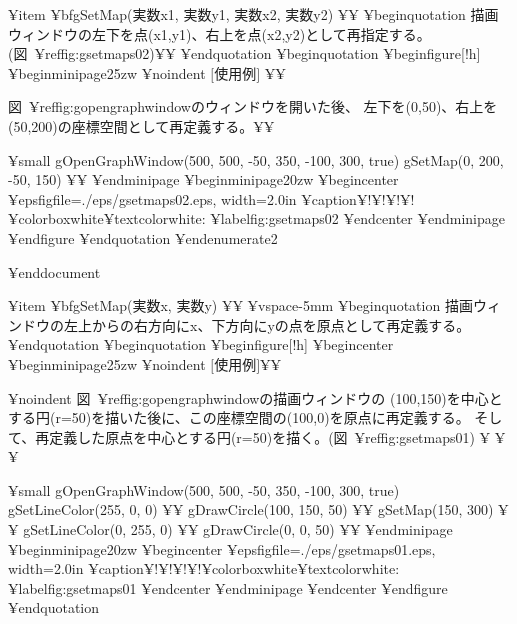 ¥item {¥bf{gSetMap(実数x1, 実数y1, 実数x2, 実数y2)}} ¥¥
  ¥begin{quotation}
     描画ウィンドウの左下を点(x1,y1)、右上を点(x2,y2)として再指定する。
     (図~¥ref{fig:gsetmaps02})¥¥
  ¥end{quotation}
¥begin{quotation}
¥begin{figure}[!h]
¥begin{minipage}{25zw}
¥noindent $[$使用例$]$ ¥¥

図~¥ref{fig:gopengraphwindow}のウィンドウを開いた後、
左下を(0,50)、右上を(50,200)の座標空間として再定義する。¥¥


{¥small{
 gOpenGraphWindow(500, 500, -50, 350, -100, 300, true)
 gSetMap(0, 200, -50, 150) ¥¥
}}
¥end{minipage}
¥begin{minipage}{20zw}
¥begin{center}
¥epsfig{file=./eps/gsetmaps02.eps, width=2.0in}
¥caption{$¥!¥!¥!¥!$¥colorbox{white}{{¥textcolor{white}{:}}}}
¥label{fig:gsetmaps02}
¥end{center}
¥end{minipage}
¥end{figure}
   ¥end{quotation}
¥end{enumerate2}

¥end{document}

¥item {¥bf{gSetMap(実数x, 実数y)}} ¥¥
¥vspace{-5mm}
   ¥begin{quotation}
     描画ウィンドウの左上からの右方向にx、下方向にyの点を原点として再定義する。
   ¥end{quotation}
   ¥begin{quotation}
¥begin{figure}[!h]
¥begin{center}
¥begin{minipage}{25zw}
	   ¥noindent $[$使用例$]$¥¥

¥noindent 図~¥ref{fig:gopengraphwindow}の描画ウィンドウの
(100,150)を中心とする円(r=50)を描いた後に、この座標空間の(100,0)を原点に再定義する。
そして、再定義した原点を中心とする円(r=50)を描く。(図~¥ref{fig:gsetmaps01})
¥ ¥¥

{¥small{
          gOpenGraphWindow(500, 500, -50, 350, -100, 300, true)
          gSetLineColor(255, 0, 0)  ¥¥
          gDrawCircle(100, 150, 50)  ¥¥
          gSetMap(150, 300) ¥¥
          gSetLineColor(0, 255, 0)  ¥¥
          gDrawCircle(0, 0, 50)  ¥¥
}}
¥end{minipage}
¥begin{minipage}{20zw}
¥begin{center}
¥epsfig{file=./eps/gsetmaps01.eps, width=2.0in}
¥caption{$¥!¥!¥!¥!$¥colorbox{white}{{¥textcolor{white}{:}}}}
¥label{fig:gsetmaps01}
¥end{center}
¥end{minipage}
¥end{center}
¥end{figure}
¥end{quotation}


